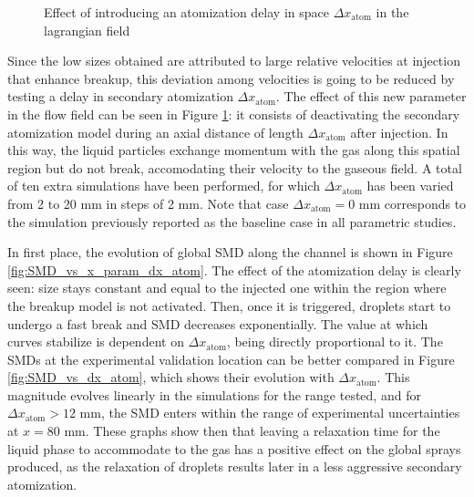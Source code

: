 \begin{figure}[ht]
	\centering	{}
	\vspace*{-0.2in}
	\caption{Effect of introducing an atomization delay in space $\Delta x_\mathrm{atom}$ in the lagrangian field}
	\label{fig:JICF_LGS_dx_atom}
\end{figure}



Since the low sizes obtained are attributed to large relative velocities at injection that enhance breakup, this deviation among velocities is going to be reduced by testing a delay in secondary atomization $\Delta x_\mathrm{atom}$. The effect of this new parameter in the flow field can be seen in Figure \ref{fig:JICF_LGS_dx_atom}: it consists of deactivating the secondary atomization model during an axial distance of length $\Delta x_\mathrm{atom}$ after injection. In this way, the liquid particles exchange momentum  with the gas along this spatial region but do not break, accomodating their velocity to the gaseous field. A total of ten extra simulations have been performed, for which $\Delta x_\mathrm{atom}$ has been varied from 2 to 20 mm in steps of 2 mm. Note that case $\Delta x_\mathrm{atom} = 0$ mm corresponds to the simulation previously reported as the baseline case in all parametric studies.

In first place, the evolution of global SMD along the channel is shown in Figure \ref{fig:SMD_vs_x_param_dx_atom}. The effect of the atomization delay is clearly seen: size stays constant and equal to the injected one within the region where the breakup model is not activated. Then, once it is triggered, droplets start to undergo a fast break and SMD decreases exponentially. The value at which curves stabilize is dependent on $\Delta x_\mathrm{atom}$, being directly proportional to it. The SMDs at the experimental validation location can be better compared in Figure \ref{fig:SMD_vs_dx_atom}, which shows their evolution with $\Delta x_\mathrm{atom}$. This magnitude evolves linearly in the simulations for the range tested, and for $\Delta x_\mathrm{atom} > 12$ mm, the SMD enters within the range of experimental uncertainties at $x = 80$ mm. These graphs show then that leaving a relaxation time for the liquid phase to accommodate to the gas has a positive effect on the global sprays produced, as the relaxation of droplets results later in a less aggressive secondary atomization.



